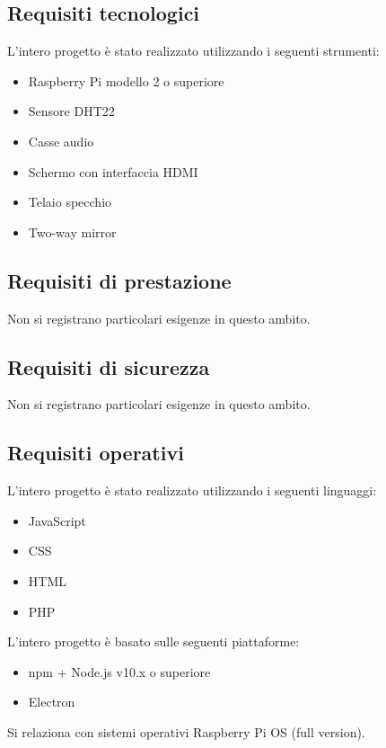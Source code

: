 \documentclass[a4paper,11pt,titlepage]{article}       %
\begin{document}
    \subsection{Requisiti tecnologici}
        L'intero progetto è stato realizzato utilizzando i seguenti strumenti:
        \begin{itemize}
            \item Raspberry Pi modello 2 o superiore
            \item Sensore DHT22
            \item Casse audio
            \item Schermo con interfaccia HDMI
            \item Telaio specchio
            \item \gls{Two-way mirror}
        \end{itemize}
        
    \subsection{Requisiti di prestazione}
        Non si registrano particolari esigenze in questo ambito.
    
    \subsection{Requisiti di sicurezza}
        Non si registrano particolari esigenze in questo ambito.
    
    \subsection{Requisiti operativi}
        L'intero progetto è stato realizzato utilizzando i seguenti linguaggi:
        \begin{itemize}
            \item JavaScript
            \item CSS
            \item HTML
            \item PHP
        \end{itemize}
        L'intero progetto è basato sulle seguenti piattaforme:
        \begin{itemize}
            \item npm + Node.js v10.x o superiore
            \item Electron
        \end{itemize}
        Si relaziona con sistemi operativi Raspberry Pi OS (full version).
    
\end{document}
